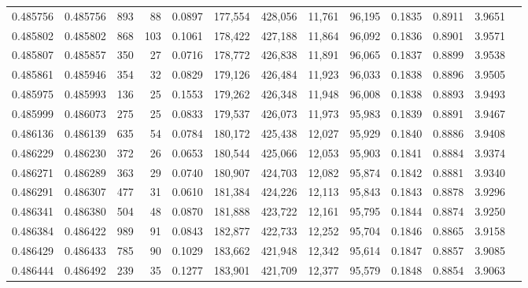 \begin{tabular}{rrrrrrrrrrrrr}
0.485756 & 0.485756 &   893 &    88 &                                     0.0897 & 177,554 & 428,056 &  11,761 &  96,195 & 0.1835 & 0.8911 & 3.9651 \\
0.485802 & 0.485802 &   868 &   103 &                                     0.1061 & 178,422 & 427,188 &  11,864 &  96,092 & 0.1836 & 0.8901 & 3.9571 \\
0.485807 & 0.485857 &   350 &    27 &                                     0.0716 & 178,772 & 426,838 &  11,891 &  96,065 & 0.1837 & 0.8899 & 3.9538 \\
0.485861 & 0.485946 &   354 &    32 &                                     0.0829 & 179,126 & 426,484 &  11,923 &  96,033 & 0.1838 & 0.8896 & 3.9505 \\
0.485975 & 0.485993 &   136 &    25 &                                     0.1553 & 179,262 & 426,348 &  11,948 &  96,008 & 0.1838 & 0.8893 & 3.9493 \\
0.485999 & 0.486073 &   275 &    25 &                                     0.0833 & 179,537 & 426,073 &  11,973 &  95,983 & 0.1839 & 0.8891 & 3.9467 \\
0.486136 & 0.486139 &   635 &    54 &                                     0.0784 & 180,172 & 425,438 &  12,027 &  95,929 & 0.1840 & 0.8886 & 3.9408 \\
0.486229 & 0.486230 &   372 &    26 &                                     0.0653 & 180,544 & 425,066 &  12,053 &  95,903 & 0.1841 & 0.8884 & 3.9374 \\
0.486271 & 0.486289 &   363 &    29 &                                     0.0740 & 180,907 & 424,703 &  12,082 &  95,874 & 0.1842 & 0.8881 & 3.9340 \\
0.486291 & 0.486307 &   477 &    31 &                                     0.0610 & 181,384 & 424,226 &  12,113 &  95,843 & 0.1843 & 0.8878 & 3.9296 \\
0.486341 & 0.486380 &   504 &    48 &                                     0.0870 & 181,888 & 423,722 &  12,161 &  95,795 & 0.1844 & 0.8874 & 3.9250 \\
0.486384 & 0.486422 &   989 &    91 &                                     0.0843 & 182,877 & 422,733 &  12,252 &  95,704 & 0.1846 & 0.8865 & 3.9158 \\
0.486429 & 0.486433 &   785 &    90 &                                     0.1029 & 183,662 & 421,948 &  12,342 &  95,614 & 0.1847 & 0.8857 & 3.9085 \\
0.486444 & 0.486492 &   239 &    35 &                                     0.1277 & 183,901 & 421,709 &  12,377 &  95,579 & 0.1848 & 0.8854 & 3.9063 \\

\end{tabular}
